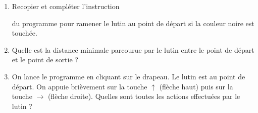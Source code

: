 \begin{enumerate}
	\item  Recopier et compléter l'instruction \begin{scratch}[scale=0.8]
		 \end{scratch} du programme pour ramener
	le lutin au point de départ si la couleur noire est touchée.	
	\item Quelle est la distance minimale parcourue par le lutin entre le point de départ et le point de sortie ?	
	\item On lance le programme en cliquant sur le drapeau. Le lutin est au point de départ. On appuie brièvement sur la touche $\uparrow$ (\og flèche haut\fg{}) puis sur la touche $\rightarrow$ (\og flèche droite\fg{}). Quelles sont toutes les actions effectuées par le lutin ?
\end{enumerate}

\vspace{0,5cm}


